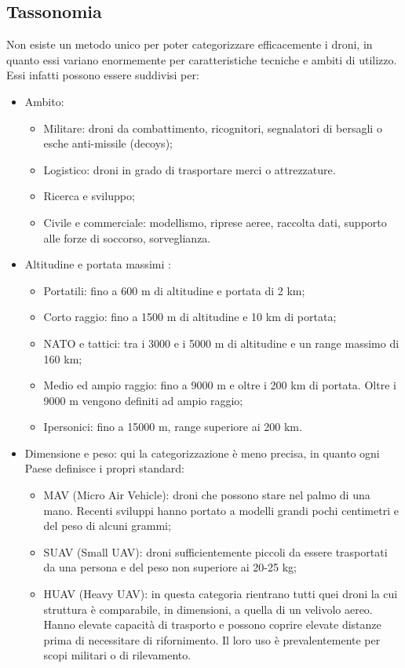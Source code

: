 \subsection[Tassonomia]{Tassonomia}
Non esiste un metodo unico per poter categorizzare efficacemente i droni, in quanto essi variano enormemente per caratteristiche tecniche e ambiti di utilizzo. Essi infatti possono essere suddivisi per:
\begin{itemize}
	\item Ambito:
		\begin{itemize}
			\item Militare: droni da combattimento, ricognitori, segnalatori di bersagli o esche anti-missile (decoys);
			\item Logistico: droni in grado di trasportare merci o attrezzature.
			\item Ricerca e sviluppo;
			\item Civile e commerciale: modellismo, riprese aeree, raccolta dati, supporto alle forze di soccorso, sorveglianza.
		\end{itemize}
	\item Altitudine e portata massimi \cite{uasglobal} :
		\begin{itemize}
			\item Portatili: fino a 600 m di altitudine e portata di 2 km; 
			\item Corto raggio: fino a 1500 m di altitudine e 10 km di portata;
			\item NATO e tattici: tra i 3000 e i 5000 m di altitudine e un range massimo di 160 km;
			\item Medio ed ampio raggio: fino a 9000 m e oltre i 200 km di portata. Oltre i 9000 m vengono definiti ad ampio raggio;
			\item Ipersonici:  fino a 15000 m, range superiore ai 200 km.
		\end{itemize}
	\item Dimensione e peso: qui la categorizzazione è meno precisa, in quanto ogni Paese definisce i propri standard:
		\begin{itemize}
			\item MAV (Micro Air Vehicle): droni che possono stare nel palmo di una mano. Recenti sviluppi hanno portato a modelli grandi pochi centimetri e del peso di alcuni grammi;
			\item SUAV (Small UAV): droni sufficientemente piccoli da essere trasportati da una persona e del peso non superiore ai 20-25 kg;
			\item HUAV (Heavy UAV):  in questa categoria rientrano tutti quei droni la cui struttura è comparabile, in dimensioni, a quella di un velivolo aereo. Hanno elevate capacità di trasporto e possono coprire elevate distanze prima di necessitare di rifornimento. Il loro uso è prevalentemente per scopi militari o di rilevamento.

\end{itemize}
\end{itemize}
